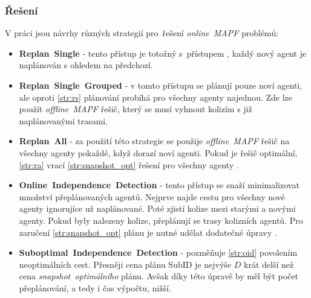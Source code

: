 %

\subsubsection{Řešení~}\label{subsubsec:reseni_online_mapf}




V práci \citet{Svancara} jsou návrhy různých strategií pro~řešení \emph{online~MAPF} problémů:
\begin{itemize}
	\item \textbf{Replan~Single} - tento přístup je totožný s~přístupem ,
	každý nový agent je naplánován s ohledem na předchozí.
	\item \textbf{Replan~Single~Grouped}\label{par:replan_single_grouped} -
	v tomto přístupu se plánují pouze noví agenti, ale oproti \ref{str:rs} plánování probíhá pro všechny agenty najednou.
	Zde lze použít \emph{offline~MAPF} řešič, který se musí vyhnout kolizím s již naplánovanými trasami.
	\item \textbf{Replan~All} - za použití této strategie se použije
	\emph{offline~MAPF} řešič na všechny agenty pokaždé, když dorazí noví agenti.
	Pokud je řešič optimální, \ref{str:ra} vrací \ref{str:snapshot_opt} řešení pro všechny agenty \citep{Svancara}.
	\item \textbf{Online~Independence~Detection} - tento přístup se snaží minimalizovat množství přeplánovaných agentů.
	Nejprve najde cestu pro všechny nové agenty ignorujíce už naplánované.
	Poté zjistí kolize mezi starými a novými agenty.
	Pokud byly nalezeny kolize, přeplánují se trasy kolizních agentů.
	Pro zaručení \ref{str:snapshot_opt} plánu je nutné udělat dodatečné úpravy \citep{Svancara}.
	\item \textbf{Suboptimal~Independence~Detection} - pozměňuje
	\ref{str:oid} povolením neoptimálních cest.
	Přesněji cena plánu SubID je nejvýše $D$ krát delší než cena \emph{snapshot~optimálního} plánu.
	Avšak díky této úpravě by měl být počet přeplánování, a tedy i čas výpočtu, nižší.
\end{itemize}


